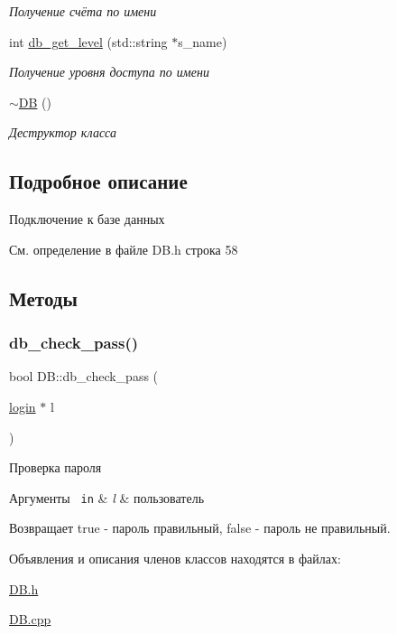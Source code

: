 \begin{DoxyCompactItemize}
\begin{DoxyCompactList}\small\item\em Получение счёта по имени \end{DoxyCompactList}\item 
int \mbox{\hyperlink{group__dbcpp_ga7792fdc9d2dc66bfa5ba84aa9db1ee8b}{db\+\_\+get\+\_\+level}} (std\+::string $\ast$s\+\_\+name)
\begin{DoxyCompactList}\small\item\em Получение уровня доступа по имени \end{DoxyCompactList}\item 
\mbox{\hyperlink{group__dbcpp_ga7bd1418f67b11d0f752537123e7e6d28}{$\sim$\+DB}} ()
\begin{DoxyCompactList}\small\item\em Деструктор класса \end{DoxyCompactList}\end{DoxyCompactItemize}


\subsection{Подробное описание}
Подключение к базе данных 

См. определение в файле D\+B.\+h строка 58



\subsection{Методы}
\mbox{\label{class_d_b_a0608c5cb7f815d143a54bda2e318de84}} 
\subsubsection{\texorpdfstring{db\_check\_pass()}{db\_check\_pass()}}
{\footnotesize\ttfamily bool D\+B\+::db\+\_\+check\+\_\+pass (\begin{DoxyParamCaption}\item[{\mbox{\hyperlink{structlogin}{login}} $\ast$}]{l }\end{DoxyParamCaption})}



Проверка пароля 


\begin{DoxyParams}[1]{Аргументы}
\mbox{\texttt{ in}}  & {\em l} & пользователь \\
\hline
\end{DoxyParams}
\begin{DoxyReturn}{Возвращает}
true -\/ пароль правильный, false -\/ пароль не правильный. 
\end{DoxyReturn}


Объявления и описания членов классов находятся в файлах\+:\begin{DoxyCompactItemize}
\item 
\mbox{\hyperlink{_d_b_8h}{D\+B.\+h}}\item 
\mbox{\hyperlink{_d_b_8cpp}{D\+B.\+cpp}}\end{DoxyCompactItemize}
